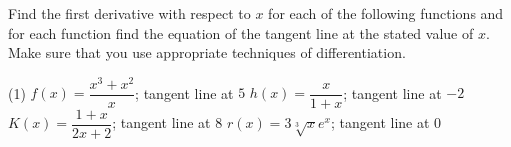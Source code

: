 \documentclass[12pt,]{book}
\theoremstyle{plain}
\theoremstyle{definition}
\numberwithin{equation}{section}
\newcommand{\fe}[2]{#1\mathopen{}\left(#2\right)\mathclose{}}
\begin{document}
\par\smallskip\noindent
\hypertarget{exercisegroup-88}{\null}Find the first derivative with respect to \(x\) for each of the following functions and for each function find the equation of the tangent line at the stated value of \(x\).  Make sure that you use appropriate techniques of differentiation.%
\par
\begin{exercisegroup}(1)
\exercise[21.]\hypertarget{exercise-421}{\null}\(\fe{f}{x}=\dfrac{x^3+x^2}{x}\); tangent line at \(5\)%
\exercise[22.]\hypertarget{exercise-422}{\null}\(\fe{h}{x}=\dfrac{x}{1+x}\); tangent line at \(-2\)%
\exercise[23.]\hypertarget{exercise-423}{\null}\(\fe{K}{x}=\dfrac{1+x}{2x+2}\); tangent line at \(8\)%
\exercise[24.]\hypertarget{exercise-424}{\null}\(\fe{r}{x}=3\sqrt[3]{x}e^x\); tangent line at \(0\)%
\end{exercisegroup}
\par\smallskip\noindent
\end{document}
